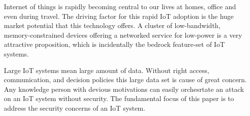 Internet of things is rapidly becoming central to our lives at homes,
office and even during travel. The driving factor for this rapid IoT
adoption is the huge market potential that this technology offers. A
cluster of low-bandwidth, memory-constrained devices offering a
networked service for low-power is a very attractive proposition,
which is incidentally the bedrock feature-set of IoT systems.

Large IoT systems mean large amount of data. Without right access,
communication, and decision policies this large data set is cause of
great concern. Any knowledge person with devious motivations can
easily orchesrtate an attack on an IoT system without security.  The
fundamental focus of this paper is to address the security concerns of
an IoT system.
